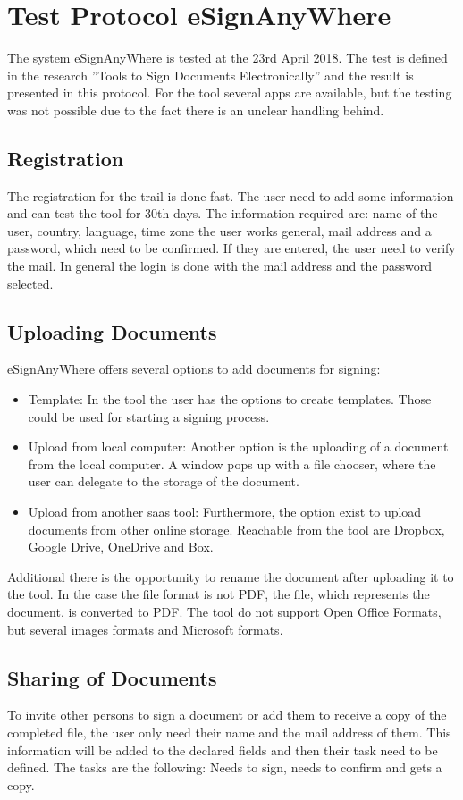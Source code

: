 \section{Test Protocol eSignAnyWhere}
\label{tool:sec:signAny}
The system eSignAnyWhere is tested at the 23rd April 2018. The test is defined in the research ''Tools to Sign Documents Electronically'' and the result is presented in this protocol. For the tool several \glspl{app} are available, but the testing was not possible due to the fact there is an unclear handling behind.

\subsection{Registration}
The registration for the trail is done fast. The user need to add some information and can test the tool for 30th days. The information required are: name of the user, country, language, time zone the user works general, mail address and a password, which need to be confirmed. If they are entered, the user need to verify the mail.
In general the login is done with the mail address and the password selected.

\subsection{Uploading Documents}
eSignAnyWhere offers several options to add documents for signing:
\begin{itemize}
	\item Template: In the tool the user has the options to create templates. Those could be used for starting a signing process.
	\item Upload from local computer: Another option is the uploading of a document from the local computer. A window pops up with a file chooser, where the user can delegate to the storage of the document. 
	\item Upload from another \gls{saas} tool: Furthermore, the option exist to upload documents from other online storage. Reachable from the tool are Dropbox, Google Drive, OneDrive and Box.
\end{itemize}
Additional there is the opportunity to rename the document after uploading it to the tool. In the case the file format is not \gls{PDF}, the file, which represents the document, is converted to \gls{PDF}. The tool do not support Open Office Formats, but several images formats and Microsoft formats.

\subsection{Sharing of Documents}
To invite other persons to sign a document or add them to receive a copy of the completed file, the user only need their name and the mail address of them. This information will be added to the declared fields and then their task need to be defined. The tasks are the following: Needs to sign, needs to confirm and gets a copy.

